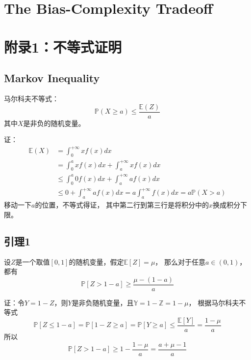\documentclass[UTF8]{ctexart}
\begin{document}
\newpage


%
%
\section{The Bias-Complexity Tradeoff}








\newpage



%
%

\section{附录1：不等式证明}
\subsection{Markov Inequality}
马尔科夫不等式：
$$
\mathbb{P}(X\geq a)\leq \frac{\mathbb{E}(Z)}{a}
$$
其中$X$是非负的随机变量。

证：
$$
\begin{aligned}
\mathbb{E}(X) &=  \int_0^{+\infty}{xf(x)dx} \\
	&= \int_0^{a}{xf(x)dx} + \int_a^{+\infty}{xf(x)dx} \\
	&\leq 
	\int_0^{a}{0f(x)dx} + \int_a^{+\infty}{af(x)dx}\\
	&\leq 0 + \int_a^{+\infty}{af(x)dx} 
   = a\int_a^{+\infty}{f(x)dx} = a\mathbb{P}(X>a)
\end{aligned}
$$
移动一下$a$的位置，不等式得证，
其中第二行到第三行是将积分中的$x$换成积分下限。

\subsection{引理1}

设$Z$是一个取值$[0,1]$的随机变量，假定$\mathbb{E}[Z]=\mu$，
那么对于任意$a\in (0,1)$，都有
$$
\mathbb{P}[Z>1-a]\geq\frac{\mu-(1-a)}{a}
$$

证：令$Y=1-Z$，则$Y$是非负随机变量，且$\mathbb{Y}=1-\mathbb{Z}=1-\mu$，
根据马尔科夫不等式
$$
\mathbb{P}[Z\leq 1-a]=
\mathbb{P}[1-Z\geq a]=
\mathbb{P}[Y\geq a]\leq \frac{\mathbb{E}[Y]}{a}=\frac{1-\mu}{a}
$$
所以
$$
\mathbb{P}[Z>1-a]\geq 1-\frac{1-\mu}{a} = \frac{a+\mu-1}{a}
$$
\end{document}
